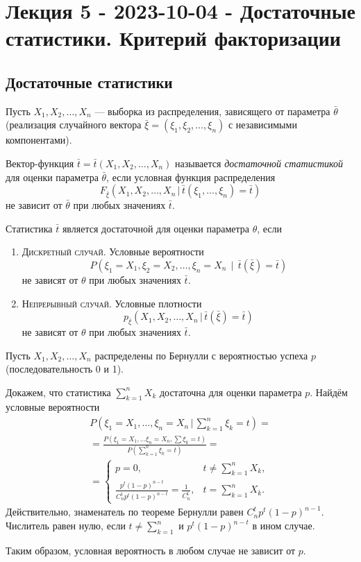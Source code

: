 \chapter{Лекция 5 - 2023-10-04 - Достаточные статистики. Критерий факторизации}
\section{Достаточные статистики}
Пусть $ X_1, X_2, \ldots, X_n $ --- выборка из распределения, зависящего от
параметра $ \bar \theta $ (реализация случайного вектора $ \bar \xi = (\xi_1,
\xi_2, \ldots, \xi_n) $ с независимыми компонентами).

\begin{definition}
  Вектор-функция $\bar t = \bar t(X_1, X_2, \dots, X_n)$ называется \emph{достаточной
	статистикой} для оценки параметра $\bar{\theta}$, если условная функция
	распределения
	\[
		F_{\bar \xi} (X_1, X_2, \dots, X_n\, | \,\bar{t} (\xi_1, \dots, \xi_n)
		= \bar t)
	\]
	не зависит от $\bar\theta$ при любых значениях $\bar t$. 
\end{definition}

\begin{remark*}
Статистика $ \bar t $ является достаточной для оценки параметра $ \theta $, если
\begin{enumerate}
	\item \textsc{Дискретный случай}. Условные вероятности 
	\[
			P(\xi_1 = X_1, \xi_2 = X_2, \ldots, \xi_n = X_n\, \mid \, \bar t(\bar \xi) = \bar
			t)
	\]
	не зависят от $ \theta $ при любых значениях $ \bar t $.
\item \textsc{Непрерывный случай}. Условные плотности  
\[
	p_{\bar \xi} (X_1, X_2, \ldots, X_n\, |\,\bar t(\bar \xi) = \bar t)
\]
не зависят от $ \theta $ при любых значениях $ \bar t $.
\end{enumerate}

\end{remark*}

\begin{ex}
  Пусть $X_1, X_2, \dots, X_n$ распределены по Бернулли с вероятностью успеха $p$
	(последовательность 0 и 1).

	Докажем, что статистика $\sum_{k=1}^n X_k$ достаточна для оценки параметра $p$.
Найдём условные вероятности
  \begin{multline*}
		P\left(\xi_1 = X_1, \dots, \xi_n = X_n\,\Big|\, \sum_{k=1}^n \xi_k =
		t\right) = \\
		= \frac{P(\xi_1 = X_1, \dots \xi_n = X_n, \sum \xi_k = t)}{P\left(\sum_{k=1}^n \xi_k = t\right)} = \\
    = \begin{cases}
			p = 0, &t \neq \sum_{k=1}^n X_k, \\
			\frac{ p^t (1-p)^{n-t} }{ C_n^t p^t (1-p)^{n-t} } = \frac{1}{C_n^t}, &t
			= \sum_{k=1}^n X_k.
    \end{cases}
  \end{multline*}
	Действительно, знаменатель по теореме Бернулли равен $ C^t_n p^t(1-p)^{n-1} $.
	Числитель равен нулю, если $ t \ne \sum_{k=1}^n $ и $ p^t(1-p)^{n-t} $ в ином
	случае.

	Таким образом, условная вероятность в любом случае не зависит от $ p $.
\end{ex}

